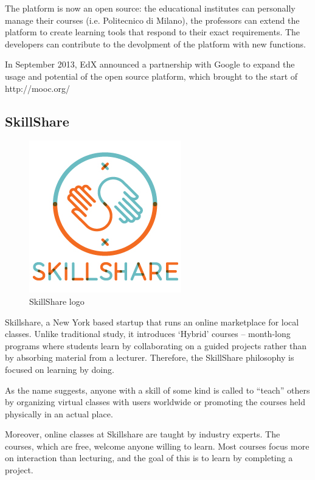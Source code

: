 The platform is now an open source: the educational institutes can personally manage their courses (i.e. Politecnico di Milano), the professors can extend the platform to create learning tools that respond to their exact requirements. The developers can contribute to the devolpment of the platform with new functions.

In September 2013, EdX announced a partnership with Google to expand the usage and potential of the open source platform, which brought to the start of http://mooc.org/


\subsection{SkillShare}
\label{subsec:SkillShare}
\begin{figure}[htb] %
 \centering
 \includegraphics[width=0.5\linewidth]{images/chapter1/skillshare.jpg}\hfill
 \caption[SkillShare logo]{SkillShare logo}
 \label{fig:fourV}
\end{figure}




Skillshare, a New York based startup that runs an online marketplace for local classes.
Unlike traditional study, it introduces ‘Hybrid’ courses – month-long programs where students learn by collaborating on a guided projects rather than by absorbing material from a lecturer. Therefore, the SkillShare philosophy is focused on learning by doing.

As the name suggests, anyone with a skill of some kind is called to “teach” others by organizing virtual classes with users worldwide or promoting the courses held physically in an actual place.

Moreover, online classes at Skillshare are taught by industry experts. The courses, which are free, welcome anyone willing to learn. Most courses focus more on interaction than lecturing, and the goal of this is to learn by completing a project.

